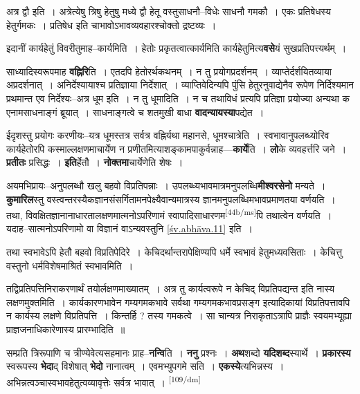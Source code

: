 \documentclass[article,12pt,a4paper]{memoir}
\begin{document}
	  \pstart अत्र द्वौ इति । अत्रेत्येषु त्रिषु हेतुषु मध्ये द्वौ हेतू वस्तुसाधनौ--विधेः साधनौ गमकौ । एकः प्रतिषेधस्य हेतुर्गमकः । प्रतिषेध इति चाभावोऽभावव्यवहारश्चोक्तो द्रष्टव्यः ।
	\pend
      

	  \pstart इदानीं कार्यहेतुं विवरीतुमाह--कार्यमिति । हेतोः प्रकृतत्वात्कार्यमिति कार्यहेतुमित्य\textbf{वसे}यं सुखप्रतिपत्त्यर्थम् ।
	\pend
      

	  \pstart साध्यादिस्वरूपमाह \textbf{वह्निरि}ति । एतदपि हेतोरर्थकथनम् । न तु प्रयोगप्रदर्शनम् । व्याप्तेर्दर्शयितव्याया अप्रदर्शनात् । अनिर्देश्यायाश्च प्रतिज्ञाया निर्देशात् । व्याप्तिवेदिन्यपि पुंसि हेतुरनुवाद्येनैव रूपेण निर्दिश्यमान प्रथमान्त एव निर्देश्यः--अत्र धूम इति । न तु धूमादिति । न च तथाविधं प्रत्यपि प्रतिज्ञा प्रयोज्या अन्यथा क एनामसाधनाङ्गं ब्रूयात् । साधनाङ्गत्वे च शतमुखी बाधा \textbf{वादन्यायस्या}पद्येत ।
	\pend
      

	  \pstart ईदृशस्तु प्रयोगः करणीयः--यत्र धूमस्तत्र सर्वत्र वह्निर्यथा महानसे, धूमश्चात्रेति । स्वभावानुपलब्ध्योरिव कार्यहेतोरपि कस्माल्लक्षणमाचार्येण न प्रणीतमित्याशङ्कामपाकुर्वन्नाह—\textbf{कार्ये}ति । \textbf{लो}के व्यवहर्त्तरि जने । \textbf{प्रतीतः} प्रसिद्धः । \textbf{इति}र्हेतौ । \textbf{नोक्तमा}चार्येणेति शेषः ।
	\pend
      

	  \pstart अयमभिप्रायः--अनुपलब्धौ खलु बहवो विप्रतिपन्नाः । उपलब्ध्यभावमात्रमनुपलब्धि\textbf{मीश्वरसेनो} मन्यते । \textbf{कुमारिल}स्तु वस्त्वन्तरस्यैकज्ञानसंसर्गितामनपेक्ष्यैवान्यमात्रस्य ज्ञानमनुपलब्धिमभावप्रमाणतया वर्णयति । तथा, विवक्षितज्ञानानाधारतालक्षणमात्मनोऽपरिणामं स्वापादिसाधारणम\leavevmode\textsuperscript{\rmlatinfont\tiny [44b/ms]}पि तथात्वेन वर्णयति । यदाह--सात्मनोऽपरिणामो वा विज्ञानं वाऽन्यवस्तुनि \cref{śv.abhāva.11} इति ।
	\pend
      

	  \pstart तथा स्वभावेऽपि हेतौ बहवो विप्रतिपेदिरे । केचिदर्थान्तरापेक्षिण्यपि धर्मे स्वभावं हेतुमध्यवसिताः । केचित्तु वस्तुनो धर्मविशेषमाश्रितं स्वभावमिति ।
	\pend
      

	  \pstart तद्विप्रतिपत्तिनिराकरणार्थं तयोर्लक्षणमाख्यातम् । अत्र तु कार्यत्वरूपे न केचिद् विप्रतिपद्यन्त इति नास्य लक्षणमुक्तमिति । कार्यकारणभावेन गम्यगमकभावे सर्वथा गम्यगमकभावप्रसङ्ग इत्यादिकायां विप्रतिपत्तावपि न कार्यस्य लक्षणे विप्रतिपत्ति । किन्तर्हि ? तस्य गमकत्वे । सा चान्यत्र निराकृताऽत्रापि प्राज्ञैः स्वयमभ्यूह्या प्राज्ञजनाधिकारेणास्य प्रारम्भादिति ॥
	\pend
      

	  \pstart सम्प्रति त्रिरूपाणि च त्रीण्येवेत्यसहमानः प्राह--\textbf{नन्वि}ति । \textbf{ननु} प्रश्नः । \textbf{अथ}शब्दो \textbf{यदिशब्द}स्यार्थे । \textbf{प्रकारस्य} स्वरूपस्य \textbf{भेदा}द् विशेषात् \textbf{भेदो} नानात्वम् । एवमभ्युपगमे सति । \textbf{एकस्ये}त्यभिन्नस्य । अभिन्नत्वञ्चास्वभावहेतुत्वव्यावृत्तेः सर्वत्र भावात् ।
	\pend
      \leavevmode\textsuperscript{\rmlatinfont\tiny [109/dm]}
\end{document}
